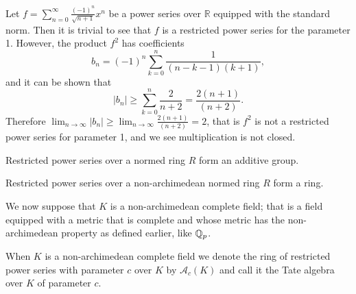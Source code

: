 \begin{example}

Let $f = \sum_{n=0}^\infty \frac{(-1)^n}{\sqrt{n+1}}x^n$ be a power series over $\mathbb{R}$
equipped with the standard norm. Then it is trivial to see that $f$ is a restricted power series for
the parameter 1. However, the product $f^2$ has coefficients
\[
b_n = (-1)^n \sum_{k=0}^n \frac{1}{(n - k -1)(k+1)},
\]
and it can be shown that
\[
\lvert b_n\rvert \geq \sum_{k = 0}^n \frac{2}{n + 2} = \frac{2 (n + 1)}{(n + 2)}.
\]
Therefore $\lim_{n \to \infty} \lvert b_n \rvert \geq \lim_{n \to \infty} \frac{2(n+1)}{(n+2)}=2$,
that is $f^2$ is not a restricted power series for parameter 1, and we see multiplication is not
closed.

\end{example}

\begin{theorem}
  Restricted power series over a normed ring $R$ form an additive group.
\end{theorem}

\begin{theorem}
  Restricted power series over a non-archimedean normed ring $R$ form a ring.
\end{theorem}

We now suppose that $K$ is a non-archimedean complete field; that is a field equipped with a metric
that is complete and whose metric has the non-archimedean property as defined earlier, like $\mathbb{Q}_p$.

\begin{definition}
    When $K$ is a non-archimedean complete field we denote the ring of restricted power series with
    parameter $c$ over $K$ by $\mathcal{A}_c(K)$ and call it the Tate algebra over $K$ of parameter
    $c$.
\end{definition}
